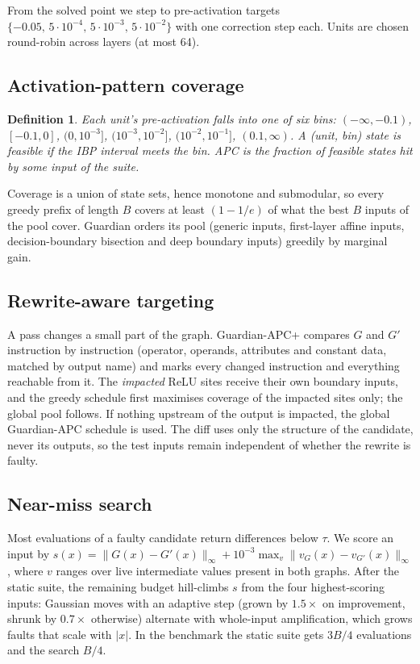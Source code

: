 \documentclass[conference]{IEEEtran}
\newtheorem{definition}{Definition}
\begin{document}
From the solved point we step to pre-activation targets $\{-0.05,\,5\!\cdot\!10^{-4},\,5\!\cdot\!10^{-3},\,5\!\cdot\!10^{-2}\}$ with one correction step each. Units are chosen round-robin across layers (at most 64).

\subsection{Activation-pattern coverage}\label{sec:apc}
\begin{definition}
Each unit's pre-activation falls into one of six bins: $(-\infty,-0.1)$, $[-0.1,0]$, $(0,10^{-3}]$, $(10^{-3},10^{-2}]$, $(10^{-2},10^{-1}]$, $(0.1,\infty)$. A (unit, bin) state is \emph{feasible} if the IBP interval meets the bin. APC is the fraction of feasible states hit by some input of the suite.
\end{definition}
Coverage is a union of state sets, hence monotone and submodular, so every greedy prefix of length $B$ covers at least $(1-1/e)$ of what the best $B$ inputs of the pool cover. Guardian orders its pool (generic inputs, first-layer affine inputs, decision-boundary bisection and deep boundary inputs) greedily by marginal gain.

\subsection{Rewrite-aware targeting}\label{sec:delta}
A pass changes a small part of the graph. Guardian-APC+ compares $G$ and $G'$ instruction by instruction (operator, operands, attributes and constant data, matched by output name) and marks every changed instruction and everything reachable from it. The \emph{impacted} ReLU sites receive their own boundary inputs, and the greedy schedule first maximises coverage of the impacted sites only; the global pool follows. If nothing upstream of the output is impacted, the global Guardian-APC schedule is used. The diff uses only the structure of the candidate, never its outputs, so the test inputs remain independent of whether the rewrite is faulty.

\subsection{Near-miss search}\label{sec:nearmiss}
Most evaluations of a faulty candidate return differences below $\tau$. We score an input by $s(x)=\|G(x)-G'(x)\|_\infty+10^{-3}\max_v\|v_G(x)-v_{G'}(x)\|_\infty$, where $v$ ranges over live intermediate values present in both graphs. After the static suite, the remaining budget hill-climbs $s$ from the four highest-scoring inputs: Gaussian moves with an adaptive step (grown by $1.5\times$ on improvement, shrunk by $0.7\times$ otherwise) alternate with whole-input amplification, which grows faults that scale with $|x|$. In the benchmark the static suite gets $3B/4$ evaluations and the search $B/4$.
\end{document}
